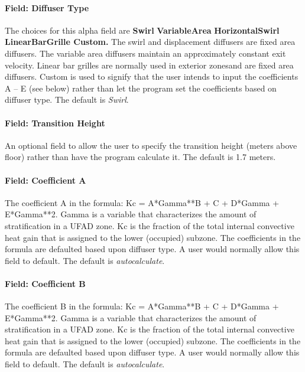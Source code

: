 \paragraph{Field: Diffuser Type}\label{field-diffuser-type}

The choices for this alpha field are \textbf{Swirl} \textbar{} \textbf{VariableArea} \textbar{} \textbf{HorizontalSwirl \textbar{} LinearBarGrille \textbar{} Custom.} The swirl and displacement diffusers are fixed area diffusers. The variable area diffusers maintain an approximately constant exit velocity. Linear bar grilles are normally used in exterior zonesand are fixed area diffusers. Custom is used to signify that the user intends to input the coefficients A -- E (see below) rather than let the program set the coefficients based on diffuser type. The default is \emph{Swirl}.

\paragraph{Field: Transition Height}\label{field-transition-height}

An optional field to allow the user to specify the transition height (meters above floor) rather than have the program calculate it. The default is 1.7 meters.

\paragraph{Field: Coefficient A}\label{field-coefficient-a}

The coefficient A in the formula: Kc = A*Gamma**B + C + D*Gamma + E*Gamma**2. Gamma is a variable that characterizes the amount of stratification in a UFAD zone. Kc is the fraction of the total internal convective heat gain that is assigned to the lower (occupied) subzone. The coefficients in the formula are defaulted based upon diffuser type. A user would normally allow this field to default. The default is \emph{autocalculate}.

\paragraph{Field: Coefficient B}\label{field-coefficient-b}

The coefficient B in the formula: Kc = A*Gamma**B + C + D*Gamma + E*Gamma**2. Gamma is a variable that characterizes the amount of stratification in a UFAD zone. Kc is the fraction of the total internal convective heat gain that is assigned to the lower (occupied) subzone. The coefficients in the formula are defaulted based upon diffuser type. A user would normally allow this field to default. The default is \emph{autocalculate}.

